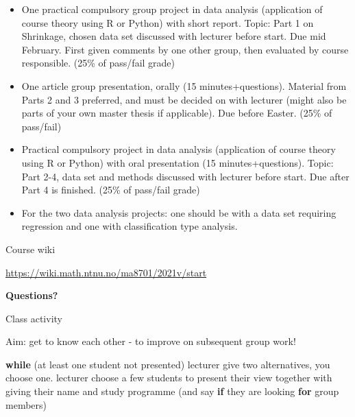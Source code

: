 \documentclass[
  ignorenonframetext,
]{beamer}
\newenvironment{Shaded}{\begin{snugshade}}{\end{snugshade}}
\newcommand{\ControlFlowTok}[1]{\textcolor[rgb]{0.13,0.29,0.53}{\textbf{#1}}}
\newcommand{\NormalTok}[1]{#1}
\begin{document}
\begin{frame}

\begin{itemize}
\item
  One practical compulsory group project in data analysis (application
  of course theory using R or Python) with short report. Topic: Part 1
  on Shrinkage, chosen data set discussed with lecturer before start.
  Due mid February. First given comments by one other group, then
  evaluated by course responsible. (25\% of pass/fail grade)
\item
  One article group presentation, orally (15 minutes+questions).
  Material from Parts 2 and 3 preferred, and must be decided on with
  lecturer (might also be parts of your own master thesis if
  applicable). Due before Easter. (25\% of pass/fail)
\item
  Practical compulsory project in data analysis (application of course
  theory using R or Python) with oral presentation (15
  minutes+questions). Topic: Part 2-4, data set and methods discussed
  with lecturer before start. Due after Part 4 is finished. (25\% of
  pass/fail grade)
\item
  For the two data analysis projects: one should be with a data set
  requiring regression and one with classification type analysis.
\end{itemize}

\end{frame}

\begin{frame}

\begin{block}{Course wiki}

\url{https://wiki.math.ntnu.no/ma8701/2021v/start}

\textbf{Questions?}

\end{block}

\end{frame}

\begin{frame}[fragile]

\begin{block}{Class activity}

Aim: get to know each other - to improve on subsequent group work!

\begin{Shaded}
\begin{Highlighting}[]
\ControlFlowTok{while}\NormalTok{ (at least one student not presented) }
\NormalTok{   lecturer give two alternatives, you choose one. }
\NormalTok{   lecturer choose a few students to present their view }
\NormalTok{   together with giving their name and study programme }
\NormalTok{   (and say }\ControlFlowTok{if}\NormalTok{ they are looking }\ControlFlowTok{for}\NormalTok{ group members)}
\end{Highlighting}
\end{Shaded}

\end{block}

\end{frame}
\end{document}
